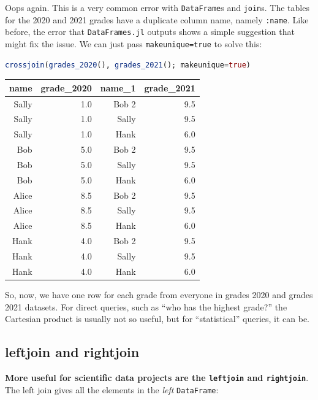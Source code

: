 \documentclass[
  notoc %
]{tufte-book}
\newcommand{\passthrough}[1]{#1}
\begin{document}
Oops again. This is a very common error with
\passthrough{\lstinline!DataFrame!}s and
\passthrough{\lstinline!join!}s. The tables for the 2020 and 2021 grades
have a duplicate column name, namely \passthrough{\lstinline!:name!}.
Like before, the error that \passthrough{\lstinline!DataFrames.jl!}
outputs shows a simple suggestion that might fix the issue. We can just
pass \passthrough{\lstinline!makeunique=true!} to solve this:

\begin{lstlisting}[language=Julia]
crossjoin(grades_2020(), grades_2021(); makeunique=true)
\end{lstlisting}

\begin{longtable}[]{@{}rrrr@{}}
\toprule
name & grade\_2020 & name\_1 & grade\_2021 \\
\midrule
\endhead
Sally & 1.0 & Bob 2 & 9.5 \\
Sally & 1.0 & Sally & 9.5 \\
Sally & 1.0 & Hank & 6.0 \\
Bob & 5.0 & Bob 2 & 9.5 \\
Bob & 5.0 & Sally & 9.5 \\
Bob & 5.0 & Hank & 6.0 \\
Alice & 8.5 & Bob 2 & 9.5 \\
Alice & 8.5 & Sally & 9.5 \\
Alice & 8.5 & Hank & 6.0 \\
Hank & 4.0 & Bob 2 & 9.5 \\
Hank & 4.0 & Sally & 9.5 \\
Hank & 4.0 & Hank & 6.0 \\
\bottomrule
\end{longtable}

So, now, we have one row for each grade from everyone in grades 2020 and
grades 2021 datasets. For direct queries, such as ``who has the highest
grade?'' the Cartesian product is usually not so useful, but for
``statistical'' queries, it can be.

\hypertarget{sec:leftjoin_rightjoin}{%
\subsection{leftjoin and rightjoin}\label{sec:leftjoin_rightjoin}}

\textbf{More useful for scientific data projects are the
\passthrough{\lstinline!leftjoin!} and
\passthrough{\lstinline!rightjoin!}}. The left join gives all the
elements in the \emph{left} \passthrough{\lstinline!DataFrame!}:
\end{document}
